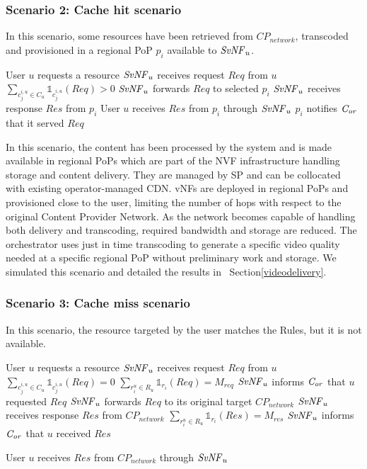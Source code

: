 \subsubsection*{Scenario 2: Cache hit scenario}

In this scenario, some resources have been retrieved from \(\mathit{CP}_{\mathit{network}}\), transcoded and provisioned in a regional PoP $p_{i}$ available to $\mathit{SvNF}_{u}$.

\begin{algorithmic}[1]
	\STATE User $u$ requests a resource
\STATE $\mathit{SvNF}_{u}$ receives request $\mathit{Req}$ from $u$
\STATE \( \sum_{c^{i,u}_{j}\in C_{u}}{\mathbb{1}_{c^{i,u}_{j}}(\mathit{Req})}>0\)
\STATE $\mathit{SvNF}_{u}$ forwards $\mathit{Req}$ to selected $p_{i}$
\STATE $\mathit{SvNF}_{u}$ receives response $\mathit{Res}$ from $p_{i}$
\STATE User $u$ receives $\mathit{Res}$ from $p_{i}$ through $\mathit{SvNF}_{u}$
\STATE $p_{i}$ notifies $\mathit{C_{or}}$ that it served  $\mathit{Req}$
\end{algorithmic}


In this scenario, the content has been processed by the system and is made available in regional PoPs which are part of the NVF infrastructure handling storage and content delivery.
They are managed by SP and can be collocated with existing operator-managed CDN.
vNFs are deployed in regional PoPs and provisioned close to the user, limiting the number of hops with respect to the original Content Provider Network.
As the network becomes capable of handling both delivery and transcoding, required bandwidth and storage are reduced. The orchestrator uses just in time transcoding to generate a specific video quality needed at a specific regional PoP without preliminary work and storage.
We simulated this scenario and detailed the results in ~Section\ref{videodelivery}.

\subsubsection*{Scenario 3: Cache miss scenario}

In this scenario, the resource targeted by the user matches the Rules, but it is not available.

\begin{algorithmic}[1]
\STATE User $u$ requests a resource
\STATE $\mathit{SvNF}_{u}$ receives request $\mathit{Req}$ from $u$
\STATE \( \sum_{c^{i,u}_{j}\in C_{u}}{\mathbb{1}_{c^{i,u}_{j}}(\mathit{Req})} = 0 \)
\STATE \( \sum_{r^{u}_{i}\in R_{u}}{\mathbb{1}_{r_{i}}(\mathit{Req})} = M_{req}  \)
\STATE $\mathit{SvNF}_{u}$ informs $\mathit{C_{or}}$ that $u$ requested $\mathit{Req}$
\ENDIF
\STATE $\mathit{SvNF}_{u}$ forwards $\mathit{Req}$ to its original target \(\mathit{CP}_{\mathit{network}}\)
\STATE $\mathit{SvNF}_{u}$ receives response $\mathit{Res}$ from \(\mathit{CP}_{\mathit{network}}\)
	\STATE \( \sum_{r^{u}_{i}\in R_{u}}{\mathbb{1}_{r_{i}}(\mathit{Res})}=M_{res}\) 
	\STATE $\mathit{SvNF}_{u}$ informs $\mathit{C_{or}}$ that $u$ received $\mathit{Res}$
	\ENDIF
\ENDIF

 
\STATE User $u$ receives $\mathit{Res}$ from \(\mathit{CP}_{\mathit{network}}\) through $\mathit{SvNF}_{u}$
\end{algorithmic}

